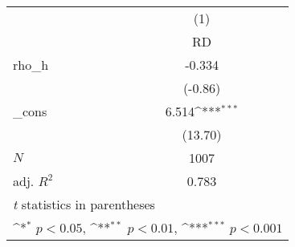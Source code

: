 {
\def\sym#1{\ifmmode^{#1}\else\(^{#1}\)\fi}
\begin{tabular}{l*{1}{c}}
\toprule
            &\multicolumn{1}{c}{(1)}\\
            &\multicolumn{1}{c}{RD}\\
\midrule
rho\_h       &      -0.334         \\
            &     (-0.86)         \\
\addlinespace
\_cons      &       6.514\sym{***}\\
            &     (13.70)         \\
\midrule
\(N\)       &        1007         \\
adj. \(R^{2}\)&       0.783         \\
\bottomrule
\multicolumn{2}{l}{\footnotesize \textit{t} statistics in parentheses}\\
\multicolumn{2}{l}{\footnotesize \sym{*} \(p<0.05\), \sym{**} \(p<0.01\), \sym{***} \(p<0.001\)}\\
\end{tabular}
}

